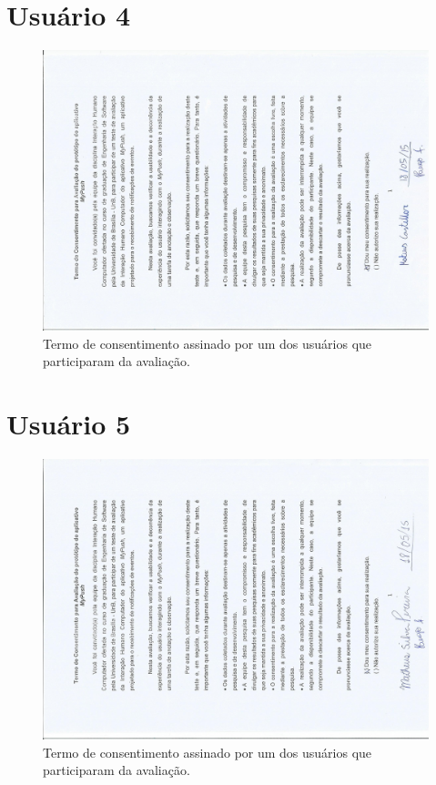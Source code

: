 \begin{anexosenv}
       \section*{Usuário 4}
    \begin{figure}[!htbp]
      \centering
      \includegraphics[scale=0.6, angle=-90]{editaveis/figuras/castellar}
      \caption{Termo de consentimento assinado por um dos usuários que participaram da avaliação.}
      \label{termo_consentimento_1}
    \end{figure}
    
       \section*{Usuário 5}
    \begin{figure}[!htbp]
      \centering
      \includegraphics[scale=0.6, angle=-90]{editaveis/figuras/silva}
      \caption{Termo de consentimento assinado por um dos usuários que participaram da avaliação.}
      \label{termo_consentimento_1}
    \end{figure}
    

\end{anexosenv}
